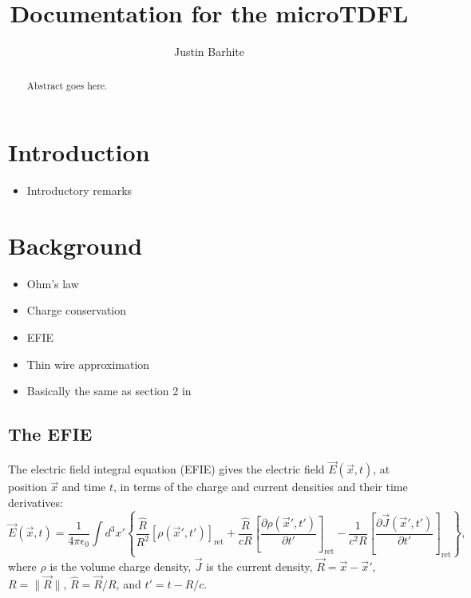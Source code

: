 \documentclass{article}
\title{Documentation for the microTDFL}
\author{Justin Barhite}
\begin{document}
\maketitle

\begin{abstract}
Abstract goes here.
\end{abstract}

\section{Introduction}
\begin{itemize}
\item Introductory remarks
\end{itemize}

\section{Background}
\begin{itemize}
\item Ohm's law
\item Charge conservation
\item EFIE
\item Thin wire approximation
\item Basically the same as section 2 in \cite{mathdev}
\end{itemize}

\subsection{The EFIE}
The electric field integral equation (EFIE) gives the electric field $\vec{E}(\vec{x}, t)$, at position $\vec{x}$ and time $t$, in terms of the charge and current densities and their time derivatives:
\begin{equation}
\vec{E}(\vec{x}, t) = \frac{1}{4\pi\epsilon_0} \int d^3x' \left\{ \frac{\hat{R}}{R^2} \left[\rho(\vec{x}', t')\right]_\text{ret} + \frac{\hat{R}}{cR} \left[\frac{\partial\rho(\vec{x}', t')}{\partial t'}\right]_\text{ret} - \frac{1}{c^2R} \left[\frac{\partial\vec{J}(\vec{x}', t')}{\partial t'}\right]_\text{ret}\right\},
\end{equation}
where $\rho$ is the volume charge density, $\vec{J}$ is the current density, $\vec{R} = \vec{x} - \vec{x}'$, $R = \|\vec{R}\|$, $\hat{R} = \vec{R}/R$, and $t' = t - R/c$.
\end{document}
